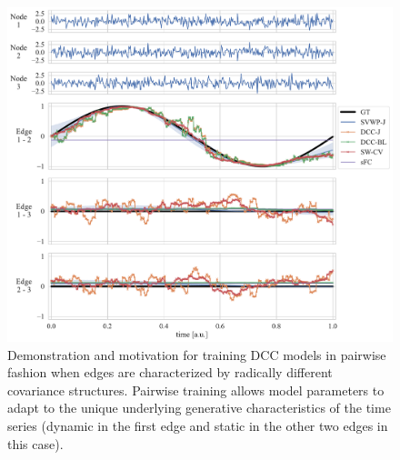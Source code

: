 \begin{figure}[t]
  \centering
  \includegraphics[width=\textwidth]{fig/sim/d3s/N0400_T0003/no_noise/periodic_1_correlations}
  \caption{
    Demonstration and motivation for training DCC models in pairwise fashion when edges are characterized by radically different covariance structures.
    Pairwise training allows model parameters to adapt to the unique underlying generative characteristics of the time series (dynamic in the first edge and static in the other two edges in this case).
  }\label{fig:pairwise-vs-joint}
\end{figure}


